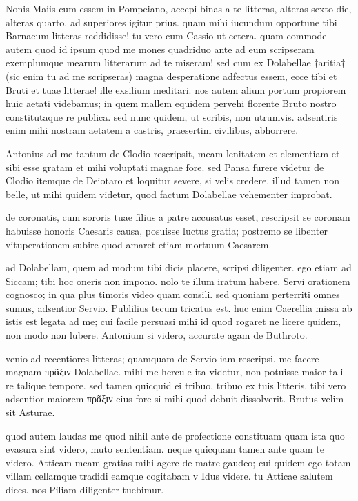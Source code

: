 


 Nonis Maiis cum essem in Pompeiano, accepi binas a te litteras, alteras sexto die, alteras quarto. ad superiores igitur prius. quam mihi iucundum opportune tibi Barnaeum litteras reddidisse! tu vero cum Cassio ut cetera. quam commode autem quod id ipsum quod me mones quadriduo ante ad eum scripseram exemplumque mearum litterarum ad te miseram! sed cum ex Dolabellae †aritia† (sic enim tu ad me scripseras) magna desperatione adfectus essem, ecce tibi et Bruti et tuae litterae! ille exsilium meditari. nos autem alium portum propiorem huic aetati videbamus; in quem mallem equidem pervehi florente Bruto nostro constitutaque re publica. sed nunc quidem, ut scribis, non utrumvis. adsentiris enim mihi nostram aetatem a castris, praesertim civilibus, abhorrere.

 Antonius ad me tantum de Clodio rescripsit, meam lenitatem et clementiam et sibi esse gratam et mihi voluptati magnae fore. sed Pansa furere videtur de Clodio itemque de Deiotaro et loquitur severe, si velis credere. illud tamen non belle, ut mihi quidem videtur, quod factum Dolabellae vehementer improbat.

 de coronatis, cum sororis tuae filius a patre accusatus esset, rescripsit se coronam habuisse honoris Caesaris causa, posuisse luctus gratia; postremo se libenter vituperationem subire quod amaret etiam mortuum Caesarem.

 ad Dolabellam, quem ad modum tibi dicis placere, scripsi diligenter. ego etiam ad Siccam; tibi hoc oneris non impono. nolo te illum iratum habere. Servi orationem cognosco; in qua plus timoris video quam consili. sed quoniam perterriti omnes sumus, adsentior Servio. Publilius tecum tricatus est. huc enim Caerellia missa ab istis est legata ad me; cui facile persuasi mihi id quod rogaret ne licere quidem, non modo non lubere. Antonium si videro, accurate agam de Buthroto.

 venio ad recentiores litteras; quamquam de Servio iam rescripsi. me facere magnam πρᾶξιν Dolabellae. mihi me hercule ita videtur, non potuisse maior tali re talique tempore. sed tamen quicquid ei tribuo, tribuo ex tuis litteris. tibi vero adsentior maiorem πρᾶξιν eius fore si mihi quod debuit dissolverit. Brutus velim sit Asturae.

 quod autem laudas me quod nihil ante de profectione constituam quam ista quo evasura sint videro, muto sententiam. neque quicquam tamen ante quam te videro. Atticam meam gratias mihi agere de matre gaudeo; cui quidem ego totam villam cellamque tradidi eamque cogitabam v Idus videre. tu Atticae salutem dices. nos Piliam diligenter tuebimur.
